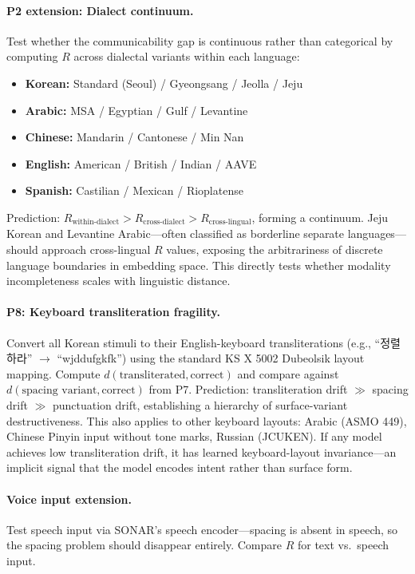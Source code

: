 \documentclass{article}
\theoremstyle{definition}
\begin{document}
\paragraph{P2 extension: Dialect continuum.}
Test whether the communicability gap is continuous rather than categorical by computing $R$ across dialectal variants within each language:
\begin{itemize}[nosep]
  \item \textbf{Korean:} Standard (Seoul) / Gyeongsang / Jeolla / Jeju
  \item \textbf{Arabic:} MSA / Egyptian / Gulf / Levantine
  \item \textbf{Chinese:} Mandarin / Cantonese / Min Nan
  \item \textbf{English:} American / British / Indian / AAVE
  \item \textbf{Spanish:} Castilian / Mexican / Rioplatense
\end{itemize}
Prediction: $R_{\text{within-dialect}} > R_{\text{cross-dialect}} > R_{\text{cross-lingual}}$, forming a continuum. Jeju Korean and Levantine Arabic---often classified as borderline separate languages---should approach cross-lingual $R$ values, exposing the arbitrariness of discrete language boundaries in embedding space. This directly tests whether modality incompleteness scales with linguistic distance.

\paragraph{P8: Keyboard transliteration fragility.}
Convert all Korean stimuli to their English-keyboard transliterations (e.g., ``정렬하라'' $\to$ ``wjddufgkfk'') using the standard KS X 5002 Dubeolsik layout mapping. Compute $d(\text{transliterated}, \text{correct})$ and compare against $d(\text{spacing variant}, \text{correct})$ from P7. Prediction: transliteration drift $\gg$ spacing drift $\gg$ punctuation drift, establishing a hierarchy of surface-variant destructiveness. This also applies to other keyboard layouts: Arabic (ASMO 449), Chinese Pinyin input without tone marks, Russian (JCUKEN). If any model achieves low transliteration drift, it has learned keyboard-layout invariance---an implicit signal that the model encodes intent rather than surface form.

\paragraph{Voice input extension.}
Test speech input via SONAR's speech encoder---spacing is absent in speech, so the spacing problem should disappear entirely. Compare $R$ for text vs.\ speech input.
\end{document}

